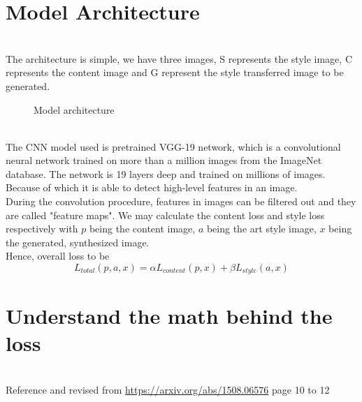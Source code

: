 \documentclass[11pt, a4paper]{article} %
\begin{document}
\section{Model Architecture}
\\ The architecture is simple, we have three images, S represents the style image, C represents the content image and G represent the style transferred image to be generated.
\begin{figure}[H]
    \centering
    \caption{Model architecture}
\end{figure}
\\ The CNN model used is pretrained VGG-19 network, which is a convolutional neural network trained on more than a million images from the ImageNet database. The network is 19 layers deep and trained on millions of images. Because of which it is able to detect high-level features in an image. 
\\ During the convolution procedure, features in images can be filtered out and they are called "feature maps". We may calculate the content loss and style loss respectively with $p$ being the content image, $a$ being the art style image, $x$ being the generated, synthesized image. 
\\ Hence, overall loss to be {\Large $$L_{total}(p, a, x) = \alpha L_{content}(p, x) + \beta L_{style}(a, x)$$}
\section{Understand the math behind the loss}
\\ Reference and revised from \url{https://arxiv.org/abs/1508.06576} page 10 to 12
\end{document}
